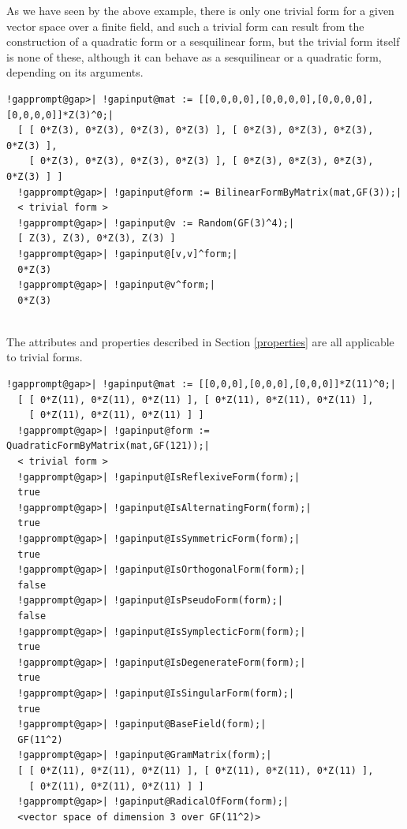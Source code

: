 \documentclass[a4paper,11pt]{report}
\begin{document}
{{\begin{Verbatim}[commandchars=!@|,fontsize=\small,frame=single,label=Example]
\end{Verbatim}
 As we have seen by the above example, there is only one trivial form for a
given vector space over a finite field, and such a trivial form can result
from the construction of a quadratic form or a sesquilinear form, but the
trivial form itself is none of these, although it can behave as a sesquilinear
or a quadratic form, depending on its arguments. 
\begin{Verbatim}[commandchars=!@|,fontsize=\small,frame=single,label=Example]
  !gapprompt@gap>| !gapinput@mat := [[0,0,0,0],[0,0,0,0],[0,0,0,0],[0,0,0,0]]*Z(3)^0;|
  [ [ 0*Z(3), 0*Z(3), 0*Z(3), 0*Z(3) ], [ 0*Z(3), 0*Z(3), 0*Z(3), 0*Z(3) ], 
    [ 0*Z(3), 0*Z(3), 0*Z(3), 0*Z(3) ], [ 0*Z(3), 0*Z(3), 0*Z(3), 0*Z(3) ] ]
  !gapprompt@gap>| !gapinput@form := BilinearFormByMatrix(mat,GF(3));|
  < trivial form >
  !gapprompt@gap>| !gapinput@v := Random(GF(3)^4);|
  [ Z(3), Z(3), 0*Z(3), Z(3) ]
  !gapprompt@gap>| !gapinput@[v,v]^form;|
  0*Z(3)
  !gapprompt@gap>| !gapinput@v^form;|
  0*Z(3)
   
\end{Verbatim}
 The attributes and properties described in Section \ref{properties} are all applicable to trivial forms. 
\begin{Verbatim}[commandchars=!@|,fontsize=\small,frame=single,label=Example]
  !gapprompt@gap>| !gapinput@mat := [[0,0,0],[0,0,0],[0,0,0]]*Z(11)^0;|
  [ [ 0*Z(11), 0*Z(11), 0*Z(11) ], [ 0*Z(11), 0*Z(11), 0*Z(11) ], 
    [ 0*Z(11), 0*Z(11), 0*Z(11) ] ]
  !gapprompt@gap>| !gapinput@form := QuadraticFormByMatrix(mat,GF(121));|
  < trivial form >
  !gapprompt@gap>| !gapinput@IsReflexiveForm(form);|
  true
  !gapprompt@gap>| !gapinput@IsAlternatingForm(form);|
  true
  !gapprompt@gap>| !gapinput@IsSymmetricForm(form);|
  true
  !gapprompt@gap>| !gapinput@IsOrthogonalForm(form);|
  false
  !gapprompt@gap>| !gapinput@IsPseudoForm(form);|
  false
  !gapprompt@gap>| !gapinput@IsSymplecticForm(form);|
  true
  !gapprompt@gap>| !gapinput@IsDegenerateForm(form);|
  true
  !gapprompt@gap>| !gapinput@IsSingularForm(form);|
  true
  !gapprompt@gap>| !gapinput@BaseField(form);|
  GF(11^2)
  !gapprompt@gap>| !gapinput@GramMatrix(form);|
  [ [ 0*Z(11), 0*Z(11), 0*Z(11) ], [ 0*Z(11), 0*Z(11), 0*Z(11) ], 
    [ 0*Z(11), 0*Z(11), 0*Z(11) ] ]
  !gapprompt@gap>| !gapinput@RadicalOfForm(form);|
  <vector space of dimension 3 over GF(11^2)>
   
\end{Verbatim}
 }

 }
\end{document}
